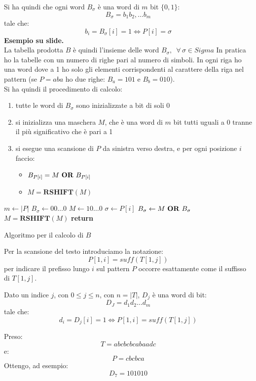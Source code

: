 \documentclass[a4paper,12pt, oneside]{book}
\begin{document}
Si ha quindi che ogni word $B_\sigma$ è una word di $m$ bit $\{0,1\}$:
\[B_\sigma=b_1b_2,\ldots b_m\]
tale che:
\[b_i=B_\sigma[i]=1\iff P[i]=\sigma\]
\textbf{Esempio su slide.}\\
La tabella prodotta $B$ è quindi l'insieme delle word
$B_\sigma,\,\,\,\forall\,\sigma\in Sigma$
In pratica ho la tabelle con un numero di righe pari al numero di simboli. In
ogni riga ho una word dove a 1 ho solo gli elementi corrispondenti al carattere
della riga nel pattern (se $P=aba$ ho due righe: $B_a=101$ e $B_b=010$).\\
Si ha quindi il procedimento di calcolo:
\begin{enumerate}
  \item tutte le word di $B_\sigma$ sono inizializzate a bit di soli 0
  \item si inizializza una maschera $M$, che è una word di $m$ bit tutti uguali
  a 0 tranne il più significativo che è pari a 1
  \item si esegue una scansione di $P$ da sinistra verso destra, e per ogni
  posizione $i$ faccio:
  \begin{itemize}
    \item $B_{P[i]}=M\mbox{ \textbf{OR} }B_{P[i]}$
    \item $M=\mathbf{RSHIFT}(M)$
  \end{itemize}
\end{enumerate}
\begin{algorithm}
  \begin{algorithmic}
    \State $m\gets |P|$
    \State $B_\sigma \gets 00\ldots0$
    \EndFor
    \State $M \gets 10\ldots0$
    \State $\sigma \gets P[i]$
    \State $B_\sigma \gets M\mbox{ \textbf{OR} }B_\sigma$
    \State $M=\mathbf{RSHIFT}(M)$
    \EndFor
    \State \textbf{return}
    \EndFunction
  \end{algorithmic}
  \caption{Algoritmo per il calcolo di $B$}
\end{algorithm}
Per la scansione del testo introduciamo la notazione:
\[P[1,i]=suff(T[1,j])\]
per indicare il prefisso lungo $i$ sul pattern $P$ occorre esattamente come il
suffisso di $T[1,j]$.
\begin{definizione}
  Dato un indice $j$, con $0\leq j\leq n$, con $n=|T|$, $D_j$ è una word di bit:
  \[D_J=d_1d_2\ldots d_m\]
  tale che:
  \[d_i=D_j[i]=1\iff P[1,i]=suff(T[1,j])\]
\end{definizione}
\begin{esempio}
  Preso:
  \[T=abcbcbcabaadc\]
  e:
  \[P=cbcbca\]
  Ottengo, ad esempio:
  \[D_7=101010\]
\end{esempio}
\end{document}
